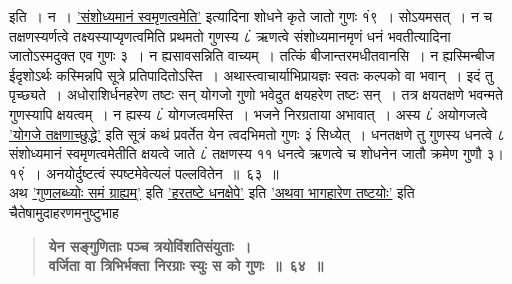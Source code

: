 \documentclass[11pt, openany]{book}
\begin{document}
\begin{sloppypar}
\noindent इति~। न~। \hyperref[1.7]{'संशोध्यमानं स्वमृणत्वमेति'} इत्यादिना शोधने कृते जातो गुणः १ं९~। सोऽयमसत्~। न च तक्षणस्यर्णत्वे तक्ष्यस्याप्यृणत्वमिति प्रथमतो गुणस्य ८ं ऋणत्वे संशोध्यमानमृणं धनं भवतीत्यादिना जातोऽस्मदुक्त एव गुणः ३~। न ह्यसावसन्निति वाच्यम्~। तत्किं बीजान्तरमधीतवानसि~। न ह्यस्मिन्बीज ईदृशोऽर्थः कस्मिन्नपि सूत्रे प्रतिपादितोऽस्ति~। अथास्त्वाचार्याभिप्रायज्ञः स्वतः कल्पको वा भवान्~। इदं तु पृच्छ्यते~। अधोराशिर्धनहरेण तष्टः सन् योगजो गुणो भवेदुत क्षयहरेण तष्टः सन्~। तत्र क्षयतक्षणे भवन्मते गुणस्यापि क्षयत्वम्~। न ह्यस्य ८ं योगजत्वमस्ति~। भजने निरग्रताया अभावात्~। अस्य ८ं अयोगजत्वे \hyperref[5.54]{'योगजे तक्षणाच्छुद्धे'} इति सूत्रं कथं प्रवर्तेत येन त्वदभिमतो गुणः ३ं सिध्येत्~। धनतक्षणे तु गुणस्य धनत्वे ८ संशोध्यमानं स्वमृणत्वमेतीति क्षयत्वे जाते ८ं तक्षणस्य ११ धनत्वे ऋणत्वे च शोधनेन जातौ क्रमेण गुणौ ३।१९ं~। अनयोर्दुष्टत्वं स्पष्टमेवेत्यलं पल्लवितेन~॥~६३~॥\\

{\small अथ \hyperref[5.55]{'गुणलब्ध्योः समं ग्राह्यम्'} इति \hyperref[5.56]{'हरतष्टे धनक्षेपे'} इति \hyperref[5.57]{'अथवा भागहारेण तष्टयोः'} इति चैतेषामुदाहरणमनुष्टुभाह\textendash }

 \label{5.64}
\begin{quote}
{\large \textbf{{\color{purple}येन सङ्गुणिताः पञ्च त्रयोविंशतिसंयुताः~।\\
वर्जिता वा त्रिभिर्भक्ता निरग्राः स्युः स को गुणः~॥~६४~॥}}}
\end{quote}


\end{sloppypar}
\end{document}
